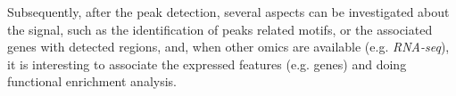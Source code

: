 Subsequently, after the peak detection, several aspects can be investigated about the signal, such as the identification of peaks related motifs, or the associated genes with detected regions, and, when other omics are available (e.g. \textit{RNA-seq}), it is interesting to associate the expressed features (e.g. genes) and doing functional enrichment analysis.





